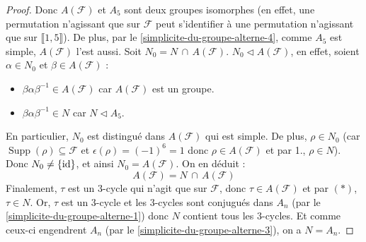 \begin{proof}
    Donc $A(\mathcal{F})$ et $A_5$ sont deux groupes isomorphes (en effet, une permutation n'agissant que sur $\mathcal{F}$ peut s'identifier à une permutation n'agissant que sur $\llbracket 1, 5 \rrbracket$). De plus, par le \cref{simplicite-du-groupe-alterne-4}, comme $A_5$ est simple, $A(\mathcal{F})$ l'est aussi.
    \newpar
    Soit $N_0 = N \, \cap \, A(\mathcal{F})$. $N_0 \lhd A(\mathcal{F})$, en effet, soient $\alpha \in N_0$ et $\beta \in A(\mathcal{F})$ :
    \begin{itemize}
      \item $\beta \alpha \beta^{-1} \in A(\mathcal{F})$ car $A(\mathcal{F})$ est un groupe.
      \item $\beta \alpha \beta^{-1} \in N$ car $N \lhd A_5$.
    \end{itemize}
    En particulier, $N_0$ est distingué dans $A(\mathcal{F})$ qui est simple. De plus, $\rho \in N_0$ (car $\operatorname{Supp}(\rho) \subseteq \mathcal{F}$ et $\epsilon(\rho) = (-1)^{6} = 1$ donc $\rho \in A(\mathcal{F})$ et par 1., $\rho \in N$). Donc $N_0 \neq \{ \operatorname{id} \}$, et ainsi $N_0 = A(\mathcal{F})$. On en déduit :
    \[ A(\mathcal{F}) = N \, \cap \, A(\mathcal{F}) \tag{$*$} \]
    Finalement, $\tau$ est un $3$-cycle qui n'agit que sur $\mathcal{F}$, donc $\tau \in A(\mathcal{F})$ et par $(*)$, $\tau \in N$. Or, $\tau$ est un $3$-cycle et les $3$-cycles sont conjugués dans $A_n$ (par le \cref{simplicite-du-groupe-alterne-1}) donc $N$ contient tous les $3$-cycles. Et comme ceux-ci engendrent $A_n$ (par le \cref{simplicite-du-groupe-alterne-3}), on a $N = A_n$.
  \end{proof}

